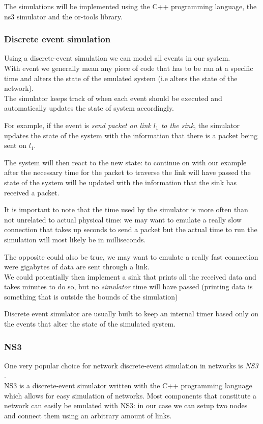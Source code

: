The simulations will be implemented using the C++ programming language, the ns3 simulator and the or-tools library.

\subsubsection{Discrete event simulation}

Using a discrete-event simulation we can model all events in our system. \\
With event we generally mean any piece of code that has to be ran at a specific time and alters the state of the emulated system (i.e alters the state of the network). \\
The simulator keeps track of when each event should be executed and automatically updates the state of system accordingly.

For example, if the event is \textit{send packet on link $l_1$ to the sink}, the simulator updates the state of the system with the information that there is a packet being sent on $l_1$.

The system will then react to the new state: to continue on with our example after the necessary time for the packet to traverse the link will have passed the state of the system will be updated with the information that the sink has received a packet.

It is important to note that the time used by the simulator is more often than not unrelated to actual physical time: we may want to emulate a really slow connection that takes up seconds to send a packet but the actual time to run the simulation will most likely be in milliseconds.

The opposite could also be true, we may want to emulate a really fast connection were gigabytes of data are sent through a link. \\

We could potentially then implement a sink that prints all the received data and takes minutes to do so, but no \textit{simulator} time will have passed (printing data is something that is outside the bounds of the simulation)

Discrete event simulator are usually built to keep an internal timer based only on the events that alter the state of the simulated system.

\subsubsection{NS3}
One very popular choice for network discrete-event simulation in networks is \textit{NS3} \cite{ns3}. \\
NS3 is a discrete-event simulator written with the C++ programming language which allows for easy simulation of networks.
Most components that constitute a network can easily be emulated with NS3: in our case we can setup two nodes and connect them using an arbitrary amount of links. \\

